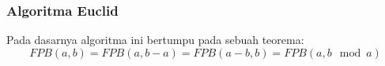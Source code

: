 \subsubsection{Algoritma Euclid}
Pada dasarnya algoritma ini bertumpu pada sebuah teorema:
$$FPB(a,b) = FPB(a,b-a) = FPB(a-b,b)=FPB(a, b \mod a)$$

